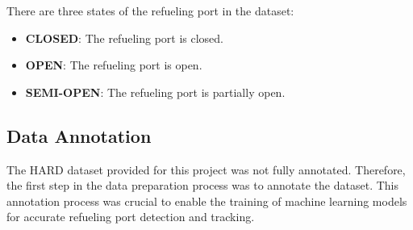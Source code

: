 \documentclass[12pt,oneside]{book} %
\begin{document}
There are three states of the refueling port in the dataset:
\begin{itemize}
    \item \textbf{CLOSED}: The refueling port is closed.
    \item \textbf{OPEN}: The refueling port is open.
    \item \textbf{SEMI-OPEN}: The refueling port is partially open.
\end{itemize}

\subsection{Data Annotation}
The HARD dataset provided for this project was not fully annotated. Therefore,
the first step in the data preparation process was to annotate the dataset.
This annotation process was crucial to enable the training of machine learning
models for accurate refueling port detection and tracking.
\end{document}
